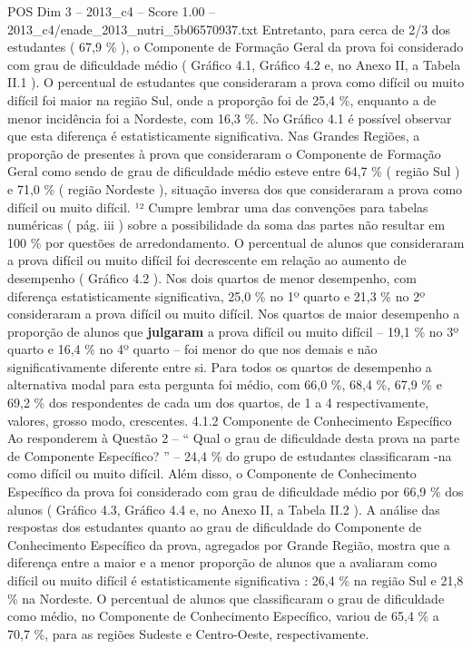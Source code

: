\begin{textsample}{POS Dim 3 – 2013\_c4 – Score 1.00 – 2013\_c4/enade\_2013\_nutri\_5b06570937.txt}
Entretanto, para cerca de 2/3 dos estudantes ( 67,9 \% ), o Componente de Formação Geral da prova foi considerado com grau de dificuldade médio ( Gráfico 4.1, Gráfico 4.2 e, no Anexo II, a Tabela II.1 ).
O percentual de estudantes que consideraram a prova como difícil ou muito difícil foi maior na região Sul, onde a proporção foi de 25,4 \%, enquanto a de menor incidência foi a Nordeste, com 16,3 \%.
No Gráfico 4.1 é possível observar que esta diferença é estatisticamente significativa.
Nas Grandes Regiões, a proporção de presentes à prova que consideraram o Componente de Formação Geral como sendo de grau de dificuldade médio esteve entre 64,7 \% ( região Sul ) e 71,0 \% ( região Nordeste ), situação inversa dos que consideraram a prova como difícil ou muito difícil. ¹² Cumpre lembrar uma das convenções para tabelas numéricas ( pág. iii ) sobre a possibilidade da soma das partes não resultar em 100 \% por questões de arredondamento.
O percentual de alunos que consideraram a prova difícil ou muito difícil foi decrescente em relação ao aumento de desempenho ( Gráfico 4.2 ).
Nos dois quartos de menor desempenho, com diferença estatisticamente significativa, 25,0 \% no 1º quarto e 21,3 \% no 2º consideraram a prova difícil ou muito difícil.
Nos quartos de maior desempenho a proporção de alunos que \textbf{julgaram} a prova difícil ou muito difícil – 19,1 \% no 3º quarto e 16,4 \% no 4º quarto – foi menor do que nos demais e não significativamente diferente entre si.
Para todos os quartos de desempenho a alternativa modal para esta pergunta foi médio, com 66,0 \%, 68,4 \%, 67,9 \% e 69,2 \% dos respondentes de cada um dos quartos, de 1 a 4 respectivamente, valores, grosso modo, crescentes. 4.1.2 Componente de Conhecimento Específico Ao responderem à Questão 2 – “ Qual o grau de dificuldade desta prova na parte de Componente Específico? ” – 24,4 \% do grupo de estudantes classificaram -na como difícil ou muito difícil.
Além disso, o Componente de Conhecimento Específico da prova foi considerado com grau de dificuldade médio por 66,9 \% dos alunos ( Gráfico 4.3, Gráfico 4.4 e, no Anexo II, a Tabela II.2 ).
A análise das respostas dos estudantes quanto ao grau de dificuldade do Componente de Conhecimento Específico da prova, agregados por Grande Região, mostra que a diferença entre a maior e a menor proporção de alunos que a avaliaram como difícil ou muito difícil é estatisticamente significativa : 26,4 \% na região Sul e 21,8 \% na Nordeste.
O percentual de alunos que classificaram o grau de dificuldade como médio, no Componente de Conhecimento Específico, variou de 65,4 \% a 70,7 \%, para as regiões Sudeste e Centro-Oeste, respectivamente.

\end{textsample}
